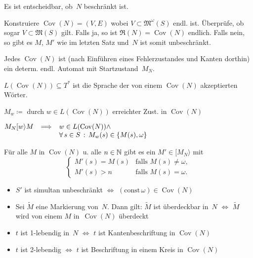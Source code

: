\documentclass{cheat-sheet}
\newcommand{\activeTransition}[1]{[{#1}\rangle} %
\newcommand{\ReachabilityGraph}{\mathfrak{R}} %
\newcommand{\Markings}{\mathfrak{M}} %
\newcommand{\ExtMarkings}{\mathfrak{M}^\omega} %
\DeclareMathOperator{\Cov}{Cov} %
\begin{document}
\begin{kor}
  Es ist entscheidbar, ob~$N$ beschränkt ist.
\end{kor}

\begin{beweis}
  Konstruiere $\Cov(N) = (V, E)$ wobei $V \subset \ExtMarkings(S)$ endl. ist.
  Überprüfe, ob sogar $V \subset \Markings(S)$ gilt.
  Falls ja, so ist $\ReachabilityGraph(N) = \Cov(N)$ endlich.
  Falls nein, so gibt es $M$, $M'$ wie im letzten Satz und~$N$ ist somit unbeschränkt.
\end{beweis}

\begin{bem}
  Jedes $\Cov(N)$ ist (nach Einführen eines Fehlerzustandes und Kanten dorthin) ein determ. endl. Automat mit Startzustand~$M_N$.
\end{bem}

\begin{defn}
  $L(\Cov(N)) \subseteq T^*$ ist die Sprache der von einem $\Cov(N)$ akzeptierten Wörter. 
\end{defn}

\begin{nota}
  $M_w \coloneqq $ durch $w \in L(\Cov(N))$ erreichter Zust. in $\Cov(N)$
\end{nota}

\begin{lem}
  $
    M_N \activeTransition{w} M \enspace \implies
    \begin{array}[t]{l}
      w \in L(\Cov(N)) \wedge \\
      \fa{s \in S} M_w(s) \in \{ M(s), \omega \}
    \end{array}
  $
\end{lem}

\begin{lem}
  Für alle $M$ in $\Cov(N)$ u. alle $n \in \mathbb{N}$ gibt es ein $M' \!\in\! \activeTransition{M_N}$ mit
  \[
    \begin{cases}
      M'(s) = M(s) & \text{falls } M(s) \neq \omega, \\
      M'(s) > n & \text{falls } M(s) = \omega.
    \end{cases}
  \]
\end{lem}

\begin{kor}
  \begin{itemize}
    \item $S'$ ist simultan unbeschränkt $\iff$ $(\mathrm{const} \, \omega) \in \Cov(N)$
    \item Sei $\tilde{M}$ eine Markierung von~$N$. Dann gilt: $\tilde{M}$ ist überdeckbar in~$N$ $\iff$ $\tilde{M}$ wird von einem $M$ in~$\Cov(N)$ überdeckt
    \item $t$ ist 1-lebendig in~$N$ $\iff$ $t$ ist Kantenbeschriftung in $\Cov(N)$
    \item $t$ ist 2-lebendig $\iff$ $t$ ist Beschriftung in einem Kreis in $\Cov(N)$
  \end{itemize}
\end{kor}
\end{document}
